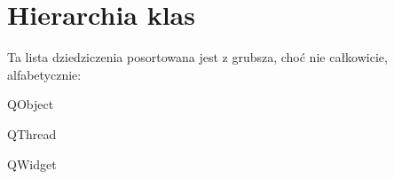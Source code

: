 \section{Hierarchia klas}
Ta lista dziedziczenia posortowana jest z grubsza, choć nie całkowicie, alfabetycznie\+:\begin{DoxyCompactList}
\item Q\+Object\begin{DoxyCompactList}
\item {}
\end{DoxyCompactList}
\item Q\+Thread\begin{DoxyCompactList}
\item {}
\end{DoxyCompactList}
\item Q\+Widget\begin{DoxyCompactList}
\item {}
\end{DoxyCompactList}
\end{DoxyCompactList}
